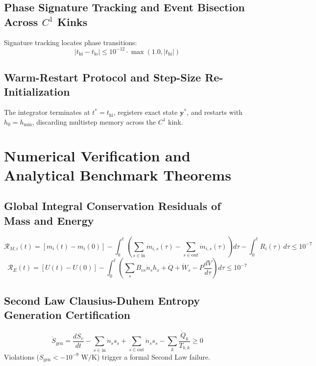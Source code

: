 \documentclass[11pt,a4paper]{article}
\begin{document}
\subsection{Phase Signature Tracking and Event Bisection Across $C^1$ Kinks}
Signature tracking locates phase transitions:
\begin{equation}
|t_{\text{hi}} - t_{\text{lo}}| \le 10^{-12} \cdot \max(1.0, |t_{\text{hi}}|)
\end{equation}

\subsection{Warm-Restart Protocol and Step-Size Re-Initialization}
The integrator terminates at $t^* = t_{\text{hi}}$, registers exact state $\mathbf{y}^*$, and restarts with $h_0 = h_{\text{min}}$, discarding multistep memory across the $C^1$ kink.

\section{Numerical Verification and Analytical Benchmark Theorems}

\subsection{Global Integral Conservation Residuals of Mass and Energy}

\begin{equation}
\mathcal{R}_{M, i}(t) = \left[ m_i(t) - m_i(0) \right] - \int_0^t \left( \sum_{s \in \text{in}} \dot{m}_{i, s}(\tau) - \sum_{s \in \text{out}} \dot{m}_{i, s}(\tau) \right) d\tau - \int_0^t R_i(\tau) \, d\tau \le 10^{-7}
\end{equation}
\begin{equation}
\mathcal{R}_E(t) = \left[ U(t) - U(0) \right] - \int_0^t \left( \sum_s B_{vs} \dot{n}_s h_s + \dot{Q} + \dot{W}_s - P \frac{dV}{d\tau} \right) d\tau \le 10^{-7}
\end{equation}

\subsection{Second Law Clausius-Duhem Entropy Generation Certification}
\begin{equation}
\dot{S}_{\text{gen}} = \frac{dS_v}{dt} - \sum_{s \in \text{in}} \dot{n}_s s_s + \sum_{s \in \text{out}} \dot{n}_s s_s - \sum_k \frac{\dot{Q}_k}{T_{b, k}} \ge 0
\end{equation}
Violations ($\dot{S}_{\text{gen}} < -10^{-9}\text{ W/K}$) trigger a formal Second Law failure.
\end{document}
